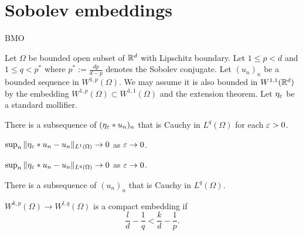 \documentclass{../../large}
\begin{document}
\section{Sobolev embeddings}
\begin{prb}
\end{prb}
\begin{prb}
\end{prb}
\begin{prb}
\end{prb}
\begin{prb} BMO
\end{prb}
\begin{prb}
Let $\Omega$ be bounded open subset of $\mathbb{R}^d$ with Lipschitz boundary.
Let $1\le p<d$ and $1\le q<p^*$ where $p^*:=\frac{dp}{d-p}$ denotes the Sobolev conjugate.
Let $(u_n)_n$ be a bounded sequence in $W^{1,p}(\Omega)$.
We may assume it is also bounded in $W^{1,1}(\mathbb{R}^d)$ by the embedding $W^{1,p}(\Omega)\subset W^{1,1}(\Omega)$ and the extension theorem.
Let $\eta_\varepsilon$ be a standard mollifier.
\begin{parts}
\item There is a subsequence of $(\eta_\varepsilon*u_n)_n$ that is Cauchy in $L^q(\Omega)$ for each $\varepsilon>0$.
\item $\sup_n\|\eta_\varepsilon*u_n-u_n\|_{L^1(\Omega)}\to0$ as $\varepsilon\to0$.
\item $\sup_n\|\eta_\varepsilon*u_n-u_n\|_{L^q(\Omega)}\to0$ as $\varepsilon\to0$.
\item There is a subsequence of $(u_n)_n$ that is Cauchy in $L^q(\Omega)$.
\item $W^{k,p}(\Omega)\to W^{l,q}(\Omega)$ is a compact embedding if
\[\frac ld-\frac1q<\frac kd-\frac1p.\]
\end{parts}
\end{prb}
\end{document}
